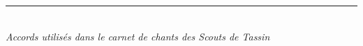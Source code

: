 \vfill

\begin{center}
  \textcolor{tassinlightbrown}{\rule{0.35\textwidth}{0.6pt}}\\[3pt]
  {\sffamily\small\color{tassindarkbrown}\textit{Accords utilisés dans le carnet de chants des Scouts de Tassin}}
\end{center}

